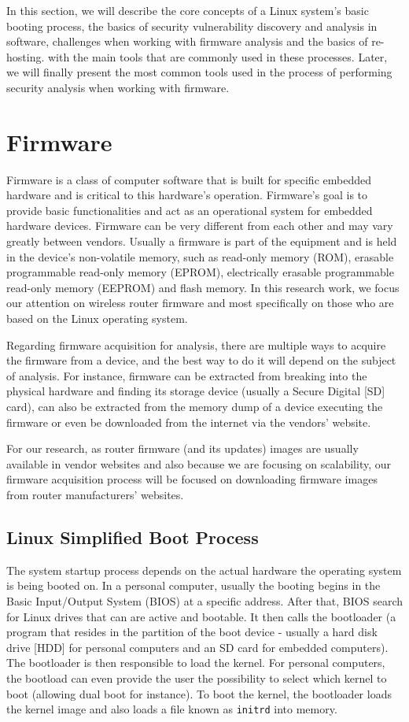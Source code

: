 In this section, we will describe the core concepts of a Linux system's basic booting process, the basics of security vulnerability discovery and analysis in software, challenges when working with firmware analysis and the basics of re-hosting.  with the main tools that are commonly used in these processes. Later, we will finally present the most common tools used in the process of performing security analysis when working with firmware.

\section{Firmware}

Firmware is a class of computer software that is built for specific embedded hardware and is critical to this hardware's operation. Firmware's goal is to provide basic functionalities and act as an operational system for embedded hardware devices. Firmware can be very different from each other and may vary greatly between vendors. Usually a firmware is part of the equipment and is held in the device's non-volatile memory, such as read-only memory (ROM), erasable programmable read-only memory (EPROM), electrically erasable programmable read-only memory (EEPROM) and flash memory. In this research work, we focus our attention on wireless router firmware and most specifically on those who are based on the Linux operating system.

Regarding firmware acquisition for analysis, there are multiple ways to acquire the firmware from a device, and the best way to do it will depend on the subject of analysis. For instance, firmware can be extracted from breaking into the physical hardware and finding its storage device (usually a Secure Digital [SD] card), can also be extracted from the memory dump of a device executing the firmware or even be downloaded from the internet via the vendors' website.

For our research, as router firmware (and its updates) images are usually available in vendor websites and also because we are focusing on scalability, our firmware acquisition process will be focused on downloading firmware images from router manufacturers' websites.

\subsection{Linux Simplified Boot Process}

The system startup process depends on the actual hardware the operating system is being booted on. In a personal computer, usually the booting begins in the Basic Input/Output System (BIOS) at a specific address. After that, BIOS search for Linux drives that can are active and bootable. It then calls the bootloader (a program that resides in the partition of the boot device - usually a hard disk drive [HDD] for personal computers and an SD card for embedded computers). The bootloader is then responsible to load the kernel. For personal computers, the bootload can even provide the user the possibility to select which kernel to boot (allowing dual boot for instance). To boot the kernel, the bootloader loads the kernel image and also loads a file known as {\tt initrd} into memory.

